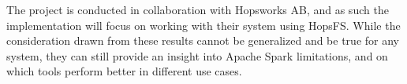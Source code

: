 The project is conducted in collaboration with Hopsworks \gls{AB}, and as such the implementation will focus on working with their system using \gls{HopsFS}. While the consideration drawn from these results cannot be generalized and be true for any system, they can still provide an insight into Apache Spark limitations, and on which tools perform better in different use cases. 